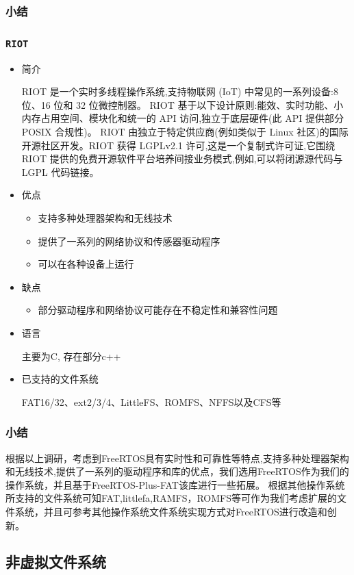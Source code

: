 \documentclass[UTF8,a4paper]{ctexart}
\begin{document}
\subsubsection{小结}

\subsubsection{\texttt{RIOT}}
\begin{itemize}
\item 简介

RIOT 是一个实时多线程操作系统,支持物联网 (IoT) 中常见的一系列设备:8 位、16 位和 32 位微控制器。
RIOT 基于以下设计原则:能效、实时功能、小内存占用空间、模块化和统一的 API 访问,独立于底层硬件(此 API 提供部分 POSIX 合规性)。
RIOT 由独立于特定供应商(例如类似于 Linux 社区)的国际开源社区开发。RIOT 获得 LGPLv2.1 许可,这是一个复制式许可证,它围绕
RIOT 提供的免费开源软件平台培养间接业务模式,例如,可以将闭源源代码与 LGPL 代码链接。
\item 优点
\begin{itemize}
    \item 支持多种处理器架构和无线技术
    \item 提供了一系列的网络协议和传感器驱动程序
    \item 可以在各种设备上运行 
\end{itemize}
\item 缺点
\begin{itemize}
    \item 部分驱动程序和网络协议可能存在不稳定性和兼容性问题
\end{itemize}
\item 语言

主要为C, 存在部分c++
\item 已支持的文件系统

FAT16/32、ext2/3/4、LittleFS、ROMFS、NFFS以及CFS等
\end{itemize}
\subsubsection{小结}
根据以上调研，考虑到FreeRTOS具有实时性和可靠性等特点,支持多种处理器架构和无线技术,提供了一系列的驱动程序和库的优点，我们选用FreeRTOS作为我们的操作系统，并且基于FreeRTOS-Plus-FAT该库进行一些拓展。
根据其他操作系统所支持的文件系统可知FAT,littlefa,RAMFS，ROMFS等可作为我们考虑扩展的文件系统，并且可参考其他操作系统文件系统实现方式对FreeRTOS进行改造和创新。

\subsection{非虚拟文件系统}
\end{document}
